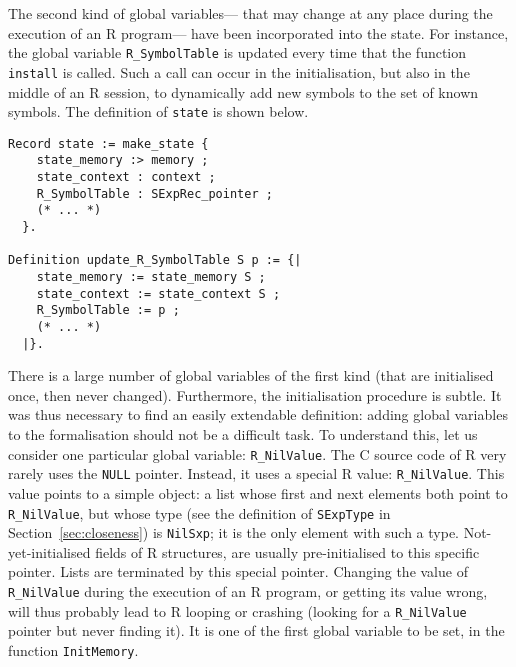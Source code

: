 \documentclass{article}
\newcommand\R{R}
\newcommand\Cn{C}
\begin{document}
The second kind of global variables—%
that may change at any place during the execution of an \R{} program—%
have been incorporated into the state.
For instance, the global variable \texttt{R_SymbolTable}
is updated every time that the function
\texttt{install} is called.
Such a call can occur in the initialisation,
but also in the middle of an \R{} session,
to dynamically add new symbols to the set of known symbols.
The definition of \texttt{state} is shown below.
\begin{verbatim}
Record state := make_state {
    state_memory :> memory ;
    state_context : context ;
    R_SymbolTable : SExpRec_pointer ;
    (* ... *)
  }.

Definition update_R_SymbolTable S p := {|
    state_memory := state_memory S ;
    state_context := state_context S ;
    R_SymbolTable := p ;
    (* ... *)
  |}.
\end{verbatim}

There is a large number of global variables of the first kind
(that are initialised once, then never changed).
Furthermore, the initialisation procedure is subtle.
It was thus necessary to find an easily extendable definition:
adding global variables to the formalisation should not be a difficult task.
To understand this, let us consider one particular
global variable: \texttt{R_NilValue}.
The \Cn{} source code of \R{} very rarely uses
the \texttt{NULL} pointer.
Instead, it uses a special \R{} value: \texttt{R_NilValue}.
This value points to a simple object:
a list whose first and next elements both point
to \texttt{R_NilValue},
but whose type
(see the definition of \texttt{SExpType} in Section~\ref{sec:closeness})
is \texttt{NilSxp};
it is the only element with such a type.
%
Not-yet-initialised fields of \R{} structures,
are usually pre-initialised to this specific pointer.
Lists are terminated by this special pointer.
Changing the value of \texttt{R_NilValue}
during the execution of an \R{} program,
or getting its value wrong,
will thus probably lead to \R{} looping or crashing
(looking for a \texttt{R_NilValue} pointer but never finding it).
It is one of the first global variable to be set,
in the function \texttt{InitMemory}.
\end{document}
